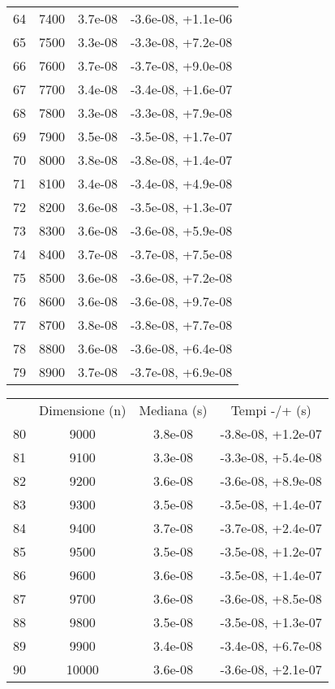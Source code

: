 \begin{table}
\begin{adjustbox}{width=1\textwidth/2}
\begin{tabular}{|c|c|c|c|}
\cline{1-4}
64 & 7400 & 3.7e-08 & -3.6e-08, +1.1e-06 \\
\cline{1-4}
65 & 7500 & 3.3e-08 & -3.3e-08, +7.2e-08 \\
\cline{1-4}
66 & 7600 & 3.7e-08 & -3.7e-08, +9.0e-08 \\
\cline{1-4}
67 & 7700 & 3.4e-08 & -3.4e-08, +1.6e-07 \\
\cline{1-4}
68 & 7800 & 3.3e-08 & -3.3e-08, +7.9e-08 \\
\cline{1-4}
69 & 7900 & 3.5e-08 & -3.5e-08, +1.7e-07 \\
\cline{1-4}
70 & 8000 & 3.8e-08 & -3.8e-08, +1.4e-07 \\
\cline{1-4}
71 & 8100 & 3.4e-08 & -3.4e-08, +4.9e-08 \\
\cline{1-4}
72 & 8200 & 3.6e-08 & -3.5e-08, +1.3e-07 \\
\cline{1-4}
73 & 8300 & 3.6e-08 & -3.6e-08, +5.9e-08 \\
\cline{1-4}
74 & 8400 & 3.7e-08 & -3.7e-08, +7.5e-08 \\
\cline{1-4}
75 & 8500 & 3.6e-08 & -3.6e-08, +7.2e-08 \\
\cline{1-4}
76 & 8600 & 3.6e-08 & -3.6e-08, +9.7e-08 \\
\cline{1-4}
77 & 8700 & 3.8e-08 & -3.8e-08, +7.7e-08 \\
\cline{1-4}
78 & 8800 & 3.6e-08 & -3.6e-08, +6.4e-08 \\
\cline{1-4}
79 & 8900 & 3.7e-08 & -3.7e-08, +6.9e-08 \\
\cline{1-4}
\end{tabular}
\end{adjustbox}
\end{table}

\begin{table}
\centering
\begin{adjustbox}{width=1\textwidth/2}
\begin{tabular}{|c|c|c|c|}
\hline
 & Dimensione (n) & Mediana (s) & Tempi -/+ (s) \\
80 & 9000 & 3.8e-08 & -3.8e-08, +1.2e-07 \\
\cline{1-4}
81 & 9100 & 3.3e-08 & -3.3e-08, +5.4e-08 \\
\cline{1-4}
82 & 9200 & 3.6e-08 & -3.6e-08, +8.9e-08 \\
\cline{1-4}
83 & 9300 & 3.5e-08 & -3.5e-08, +1.4e-07 \\
\cline{1-4}
84 & 9400 & 3.7e-08 & -3.7e-08, +2.4e-07 \\
\cline{1-4}
85 & 9500 & 3.5e-08 & -3.5e-08, +1.2e-07 \\
\cline{1-4}
86 & 9600 & 3.6e-08 & -3.5e-08, +1.4e-07 \\
\cline{1-4}
87 & 9700 & 3.6e-08 & -3.6e-08, +8.5e-08 \\
\cline{1-4}
88 & 9800 & 3.5e-08 & -3.5e-08, +1.3e-07 \\
\cline{1-4}
89 & 9900 & 3.4e-08 & -3.4e-08, +6.7e-08 \\
\cline{1-4}
90 & 10000 & 3.6e-08 & -3.6e-08, +2.1e-07 \\
\cline{1-4}
\end{tabular}
\end{adjustbox}
\end{table}

